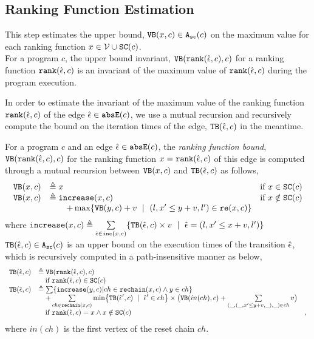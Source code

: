  \subsection{Ranking Function Estimation}
 This step estimates the upper bound, ${\mathtt{VB}}(x, c) \in {\ensuremath{\mathtt{A_{sc}}}}(c)$
 on the maximum value for each ranking function $x \in \mathcal{V} \cup \mathtt{SC}(c)$.
 \\
 For a program $c$, the upper bound invariant,
 ${\mathtt{VB}}(\mathtt{rank}(\hat{\mathtt{\epsilon}{}}, c), c)$ for a ranking function $\mathtt{rank}(\hat{\mathtt{\epsilon}{}}, c)$ 
 is an invariant of the maximum value of $\mathtt{rank}(\hat{\mathtt{\epsilon}{}}, c)$ during the program execution.

 In order to estimate the invariant of the maximum value of the ranking function $\mathtt{rank}(\hat{\mathtt{\epsilon}{}}, c)$
 of the edge $\hat{\mathtt{\epsilon}{}} \in \mathtt{abs}{\mathtt{E}}(c)$, we use a mutual recursion and recursively compute
 the bound on the iteration times of the edge, ${\mathtt{TB}}(\hat{\mathtt{\epsilon}{}}, c)$ in the meantime.
 \begin{defn}
 \label{def:ranking_bound}
 For a program $c$ and an edge $\hat{\mathtt{\epsilon}{}} \in \mathtt{abs}{\mathtt{E}}(c)$,
 the \emph{ranking function bound}, 
 ${\mathtt{VB}}(\mathtt{rank}(\hat{\mathtt{\epsilon}{}}, c), c)$ for the ranking function $x = \mathtt{rank}(\hat{\mathtt{\epsilon}{}}, c)$
 of this edge
 is computed through a mutual recursion between ${\mathtt{VB}}(x, c)$ and ${\mathtt{TB}}(\hat{\mathtt{\epsilon}{}}, c)$ as follows,
 \[ 
 \begin{array}{lll}
 \varinvar(x, c) & \triangleq x & \text{if} ~ x \in \scvar(c) \\
 \varinvar(x, c) & \triangleq \incrs(x, c) & \text{if} ~ x \notin \scvar(c) \\
 & \qquad + \max\left\{\varinvar(y, c) + v ~\mid~ (l, x' \leq y + v, l') \in \reset(x, c) \right\} &
 \end{array}
 \]
 where $\mathtt{increase}(x, c) \triangleq \sum\limits_{\hat{\mathtt{\epsilon}{}} \in \mathtt{inc}(x, c)}\{{\mathtt{TB}}(\hat{\mathtt{\epsilon}{}}, c) \times v ~\mid~ \hat{\mathtt{\epsilon}{}} = (l, x' \leq x + v, l')\}$
${\mathtt{TB}}(\hat{\mathtt{\epsilon}{}}, c) \in {\ensuremath{\mathtt{A_{sc}}}}(c)$ is an upper bound on the execution times of the transition $\hat{\mathtt{\epsilon}{}}$, which is recursively computed in a path-insensitive manner as below,
\[ 
\begin{array}{lll}
 \absclr(\absevent, c) 
 & \triangleq \varinvar(\rank(\absevent, c), c) & \\
 & \quad \text{if} ~ \rank(\absevent, c) \in \scvar(c) & \\
 \absclr(\absevent, c) 
 & \triangleq
 \sum \left\{ \incrs(y, c) | ch \in \resetchain(x, c) \land y \in ch \right\} & \\
 & \quad + 
 \sum\limits_{ch \in \resetchain(x, c)}
 \min \left\{\absclr(\absevent', c) ~\mid~ \absevent' \in ch\right\} \times 
 \big(\varinvar(in(ch), c) 
 + \sum\limits_{(\_, (\_, x' \leq y + v, \_), \_) \in ch} v \big) & \\
 & \quad \text{if} ~\rank(\absevent, c) = x \land x \notin \scvar(c) & ,
\end{array}
 \]
 where $in(ch)$ is the first vertex of the reset chain $ch$.
\end{defn}
